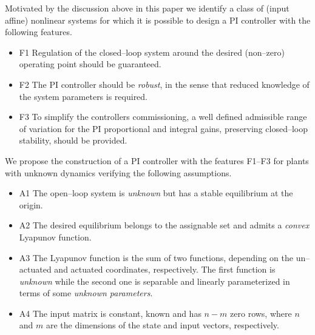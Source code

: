 \documentclass[10pt, conference]{ieeeconf}
\def\begite{\begin{itemize}}
\def\endite{\end{itemize}}
\begin{document}
Motivated by the discussion above in this paper we identify a class of (input affine) nonlinear systems for which it is possible to design a PI controller with the following features.
\begite
\item[F1] Regulation of the closed--loop system around the desired (non--zero) operating point should be guaranteed.
\item[F2] The PI controller should be {\em robust}, in the sense that reduced knowledge of the system parameters is required.
\item[F3] To simplify the controllers commissioning, a well defined admissible range of variation for the PI proportional and integral gains, preserving closed--loop stability, should be provided.
\endite
We propose the construction of a PI controller with the features F1--F3 for plants with unknown dynamics verifying the following assumptions.
\begite
\item[A1] The open--loop system is {\em unknown} but has a stable equilibrium at the origin.
\item[A2] The desired equilibrium belongs to the assignable set and admits a {\em convex} Lyapunov function.
\item[A3] The Lyapunov function is the sum of two functions, depending on the un--actuated and actuated coordinates, respectively. The first function is {\em unknown} while the second one is separable and linearly parameterized in terms of some {\em unknown parameters}.
\item[A4] The input matrix is constant, known and has $n-m$ zero rows, where $n$ and $m$ are the dimensions of the state  and  input vectors, respectively.
\endite
\end{document}
